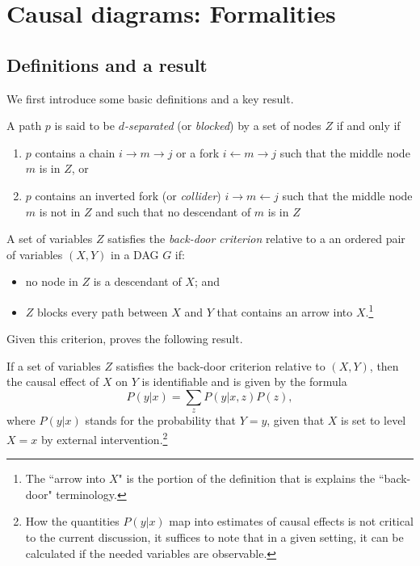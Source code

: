 \documentclass[11pt,reqno,titlepage]{amsart}
\begin{document}
\clearpage


\clearpage



\clearpage


\appendix
\section{Causal diagrams: Formalities} \label{append}
 
 \subsection{Definitions and a result}
 We first introduce some basic definitions and a key result.
 
\begin{definition}
A path $p$ is said to be \emph{$d$-separated} (or \emph{blocked}) by a set of nodes $Z$ if and only if
\begin{enumerate}
	\item $p$ contains a chain $i \rightarrow m \rightarrow j$ or a fork $i \leftarrow m \rightarrow j$ such that the middle node $m$ is in $Z$, or
	\item $p$ contains an inverted fork (or \emph{collider}) $i \rightarrow m \leftarrow j$ such that the middle node $m$ is not in $Z$ and such that no descendant of $m$ is in $Z$
\end{enumerate}
\end{definition}

\begin{definition}
A set of variables $Z$ satisfies the \emph{back-door criterion} relative to a an ordered pair of variables $(X, Y)$ in a 
	DAG $G$ if:
	\begin{itemize}
		\item no node in $Z$ is a descendant of $X$; and
		\item $Z$ blocks every path between $X$ and $Y$ that contains an arrow into $X$.\footnote{The ``arrow into $X$" is the portion of the definition that is explains the ``back-door" terminology.}
	\end{itemize}
\end{definition}%
Given this criterion, \citet[p.\,79]{Pearl:2009vo} proves the following result.
%
\begin{theorem}
	If a set of variables $Z$ satisfies the back-door criterion relative to $(X, Y)$, then the causal effect of $X$ on $Y$ is identifiable and is given by the formula 
	\[ P(y | x) = \sum_{z} P(y | x, z) P(z), \]
where $P(y|x)$ stands for the probability that $Y = y$, given that $X$ is set to level $X=x$ by external intervention.\footnote{
How the quantities $P(y|x)$ map into estimates of causal effects is not critical to the current discussion, it suffices to note that in a given setting, it can be calculated if the needed variables are observable.}
\end{theorem}
%
\end{document}
